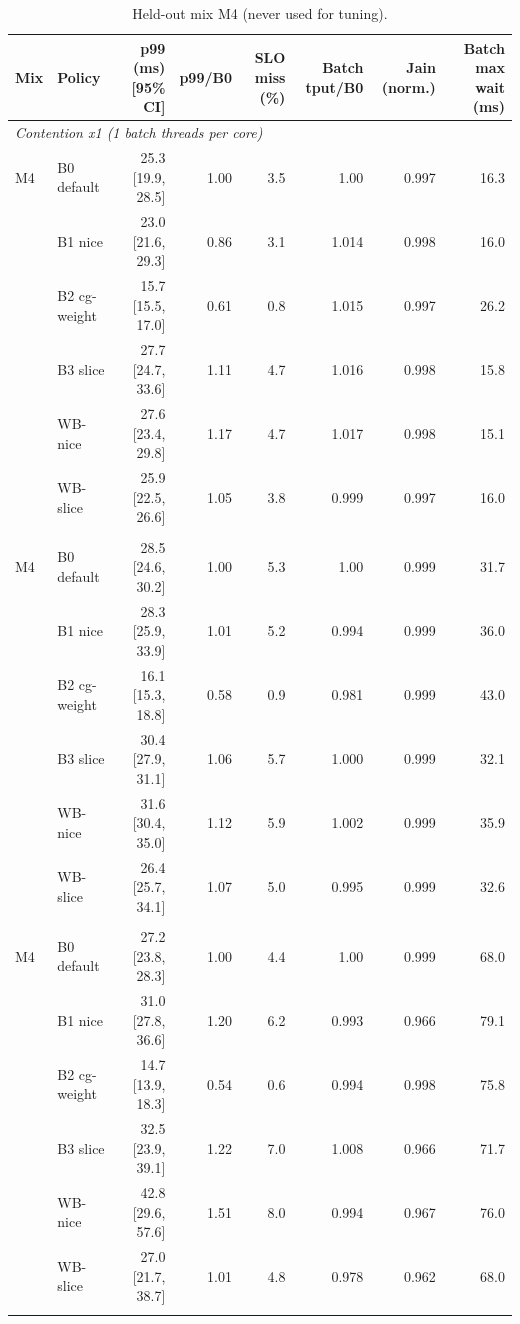 \begin{table}[t]
\centering
\footnotesize
\caption{Held-out mix M4 (never used for tuning).}
\label{tab:heldout}
\begin{tabular}{llrrrrrr}
\toprule
Mix & Policy & p99 (ms) [95\% CI] & p99/B0 & SLO miss (\%) & Batch tput/B0 & Jain (norm.) & Batch max wait (ms) \\
\midrule
\multicolumn{8}{l}{\textit{Contention x1 (1 batch threads per core)}} \\
M4 & B0 default & 25.3 {\scriptsize[19.9, 28.5]} & 1.00 & 3.5 & 1.00 & 0.997 & 16.3 \\
 & B1 nice & 23.0 {\scriptsize[21.6, 29.3]} & 0.86 & 3.1 & 1.014 & 0.998 & 16.0 \\
 & B2 cg-weight & 15.7 {\scriptsize[15.5, 17.0]} & 0.61 & 0.8 & 1.015 & 0.997 & 26.2 \\
 & B3 slice & 27.7 {\scriptsize[24.7, 33.6]} & 1.11 & 4.7 & 1.016 & 0.998 & 15.8 \\
 & WB-nice & 27.6 {\scriptsize[23.4, 29.8]} & 1.17 & 4.7 & 1.017 & 0.998 & 15.1 \\
 & WB-slice & 25.9 {\scriptsize[22.5, 26.6]} & 1.05 & 3.8 & 0.999 & 0.997 & 16.0 \\
\addlinespace[2pt]
\multicolumn{8}{l}{\textit{Contention x2 (2 batch threads per core)}} \\
M4 & B0 default & 28.5 {\scriptsize[24.6, 30.2]} & 1.00 & 5.3 & 1.00 & 0.999 & 31.7 \\
 & B1 nice & 28.3 {\scriptsize[25.9, 33.9]} & 1.01 & 5.2 & 0.994 & 0.999 & 36.0 \\
 & B2 cg-weight & 16.1 {\scriptsize[15.3, 18.8]} & 0.58 & 0.9 & 0.981 & 0.999 & 43.0 \\
 & B3 slice & 30.4 {\scriptsize[27.9, 31.1]} & 1.06 & 5.7 & 1.000 & 0.999 & 32.1 \\
 & WB-nice & 31.6 {\scriptsize[30.4, 35.0]} & 1.12 & 5.9 & 1.002 & 0.999 & 35.9 \\
 & WB-slice & 26.4 {\scriptsize[25.7, 34.1]} & 1.07 & 5.0 & 0.995 & 0.999 & 32.6 \\
\addlinespace[2pt]
\multicolumn{8}{l}{\textit{Contention x4 (4 batch threads per core)}} \\
M4 & B0 default & 27.2 {\scriptsize[23.8, 28.3]} & 1.00 & 4.4 & 1.00 & 0.999 & 68.0 \\
 & B1 nice & 31.0 {\scriptsize[27.8, 36.6]} & 1.20 & 6.2 & 0.993 & 0.966 & 79.1 \\
 & B2 cg-weight & 14.7 {\scriptsize[13.9, 18.3]} & 0.54 & 0.6 & 0.994 & 0.998 & 75.8 \\
 & B3 slice & 32.5 {\scriptsize[23.9, 39.1]} & 1.22 & 7.0 & 1.008 & 0.966 & 71.7 \\
 & WB-nice & 42.8 {\scriptsize[29.6, 57.6]} & 1.51 & 8.0 & 0.994 & 0.967 & 76.0 \\
 & WB-slice & 27.0 {\scriptsize[21.7, 38.7]} & 1.01 & 4.8 & 0.978 & 0.962 & 68.0 \\
\addlinespace[2pt]
\bottomrule
\end{tabular}
\end{table}
